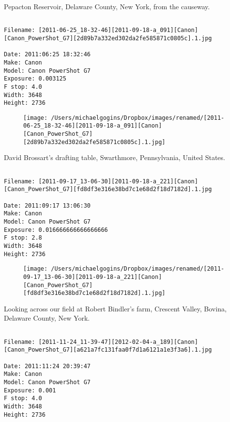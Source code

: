 \clearpage
\onecolumn
\noindent Pepacton Reservoir, Delaware County, New York, from the causeway.
\noindent
\begin{lstlisting}

Filename: [2011-06-25_18-32-46][2011-09-18-a_091][Canon][Canon_PowerShot_G7][2d89b7a332ed302da2fe585871c0805c].1.jpg

Date: 2011:06:25 18:32:46
Make: Canon
Model: Canon PowerShot G7
Exposure: 0.003125
F stop: 4.0
Width: 3648
Height: 2736
\end{lstlisting}
\clearpage

\begin{figure}
\texttt{[image: /Users/michaelgogins/Dropbox/images/renamed/[2011-06-25\_18-32-46][2011-09-18-a\_091][Canon][Canon\_PowerShot\_G7][2d89b7a332ed302da2fe585871c0805c].1.jpg]}
\end{figure}
    
\clearpage
\onecolumn
\noindent David Brossart's drafting table, Swarthmore, Pennsylvania, United States.
\noindent
\begin{lstlisting}

Filename: [2011-09-17_13-06-30][2011-09-18-a_221][Canon][Canon_PowerShot_G7][fd8df3e316e38bd7c1e68d2f18d7182d].1.jpg

Date: 2011:09:17 13:06:30
Make: Canon
Model: Canon PowerShot G7
Exposure: 0.016666666666666666
F stop: 2.8
Width: 3648
Height: 2736
\end{lstlisting}
\clearpage

\begin{figure}
\texttt{[image: /Users/michaelgogins/Dropbox/images/renamed/[2011-09-17\_13-06-30][2011-09-18-a\_221][Canon][Canon\_PowerShot\_G7][fd8df3e316e38bd7c1e68d2f18d7182d].1.jpg]}
\end{figure}
    
\clearpage
\onecolumn
\noindent Looking across our field at Robert Bindler's farm, Crescent Valley, Bovina, Delaware County, New York.
\noindent
\begin{lstlisting}

Filename: [2011-11-24_11-39-47][2012-02-04-a_189][Canon][Canon_PowerShot_G7][a621a7fc131faa0f7d1a6121a1e3f3a6].1.jpg

Date: 2011:11:24 20:39:47
Make: Canon
Model: Canon PowerShot G7
Exposure: 0.001
F stop: 4.0
Width: 3648
Height: 2736
\end{lstlisting}
\clearpage

